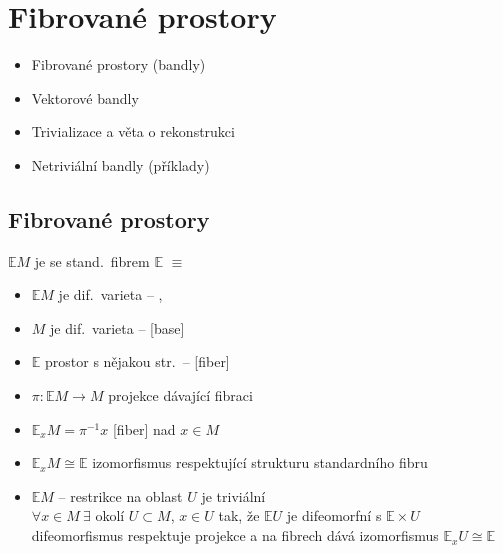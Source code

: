 \section{Fibrované prostory}

\begin{itemize}[nosep]
  \item Fibrované prostory (bandly)
  \item Vektorové bandly
  \item Trivializace a věta o rekonstrukci
  \item Netriviální bandly (příklady)
\end{itemize}

\newpage
{}
\subsection{Fibrované prostory}

\begin{definice}
$\mathbb{E}M$ je  se stand.\ fibrem $\mathbb{E}$ $\equiv$
\begin{itemize}[nosep]
  \item[] $\mathbb{E}M$ je dif.\ varieta \hfill -- , 
  \item[] $M$ je dif.\ varieta \hfill --  [base] 
  \item[] $\mathbb{E}$ prostor s nějakou str.\ \hfill --  [fiber]
  \item[] $\pi:\mathbb{E}M\to M$ \quad projekce dávající fibraci
  \item[] $\mathbb{E}_xM = \pi^{-1}x$ \quad {} [fiber] nad $x\in M$
  \item[] $\mathbb{E}_xM \cong \mathbb{E}$ \quad izomorfismus respektující strukturu standardního fibru
  \item[]  $\mathbb{E}M$ -- restrikce na  oblast $U$ je triviální \\
          $\forall x\in M\ \exists$ okolí $U\subset M$, $x\in U$ tak, že $\mathbb{E}U$ je difeomorfní s $\mathbb{E}\times U$ \\
          difeomorfismus respektuje projekce a na fibrech dává izomorfismus $\mathbb{E}_xU\cong\mathbb{E}$
\end{itemize}
\end{definice}

